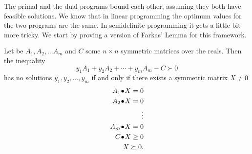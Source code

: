 \documentclass[a4paper,twoside,justified]{tufte-handout}
\begin{document}
The primal and the dual programs bound each other, assuming they both
have feasible solutions. We know that in linear programming the
optimum values for the two programs are the same. In semidefinite
programming it gets a little bit more tricky.  We start by proving a
version of Farkas' Lemma for this framework.

\begin{lemma}
  \label{lmm:farkas_sdp}
  Let be $A_{1}, A_{2}, \ldots A_{m}$ and $C$ some $n \times n$
  symmetric matrices over the reals. Then the inequality
  \begin{equation}\label{eq:farkas_pd}
    y_{1}A_{1}+y_{2}A_{2} + \cdots + y_{m}A_{m} - C \succ 0
  \end{equation}
  has no solutions $ y_{1}, y_{2}, \ldots,y_{m} $ if and only if there
  exists a symmetric matrix $ X\not=0 $
\begin{alignat*}{2}
  \pointwiseprod{A_{1}}{X} = 0\\
   \pointwiseprod{A_{2}}{X} = 0\\
   \vdots \\
   \pointwiseprod{A_{m}}{X} = 0 \\
   \pointwiseprod{C}{X} \geq 0\\
   X \succeq 0.
\end{alignat*}
\end{lemma}
\end{document}
